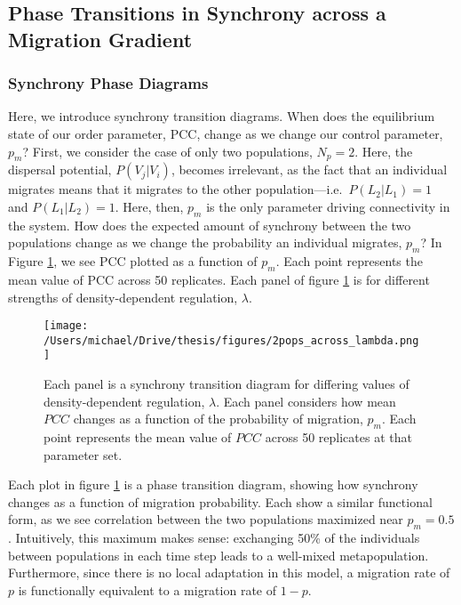 \pagebreak

\hypertarget{phase-transitions-in-synchrony-across-a-migration-gradient}{%
\subsection{Phase Transitions in Synchrony across a Migration
Gradient}\label{phase-transitions-in-synchrony-across-a-migration-gradient}}

\hypertarget{synchrony-phase-diagrams}{%
\subsubsection{Synchrony Phase
Diagrams}\label{synchrony-phase-diagrams}}

Here, we introduce synchrony transition diagrams. When does the
equilibrium state of our order parameter, \(\text{PCC}\), change as we
change our control parameter, \(p_m\)? First, we consider the case of
only two populations, \(N_p=2\). Here, the dispersal potential,
\(P(V_j|V_i)\), becomes irrelevant, as the fact that an individual
migrates means that it migrates to the other
population---i.e.~\(P(L_2|L_1)=1\) and \(P(L_1|L_2)=1\). Here, then,
\(p_m\) is the only parameter driving connectivity in the system. How
does the expected amount of synchrony between the two populations change
as we change the probability an individual migrates, \(p_m\)? In Figure
\ref{2pops_across_lambda}, we see \(\text{PCC}\) plotted as a function
of \(p_m\). Each point represents the mean value of \(\text{PCC}\)
across 50 replicates. Each panel of figure \ref{2pops_across_lambda} is
for different strengths of density-dependent regulation, \(\lambda\).

\begin{figure}[h]

\texttt{[image: /Users/michael/Drive/thesis/figures/2pops\_across\_lambda.png]}

\caption{Each panel is a synchrony transition diagram for differing values of density-dependent regulation, $\lambda$. Each panel considers how mean $PCC$ changes as a function of the probability of migration, $p_m$. Each point represents the mean value of $PCC$ across 50 replicates at that parameter set.}

\label{2pops_across_lambda}

\end{figure}

Each plot in figure \ref{2pops_across_lambda} is a phase transition
diagram, showing how synchrony changes as a function of migration
probability. Each show a similar functional form, as we see correlation
between the two populations maximized near \(p_m=0.5\). Intuitively,
this maximum makes sense: exchanging 50\% of the individuals between
populations in each time step leads to a well-mixed metapopulation.
Furthermore, since there is no local adaptation in this model, a
migration rate of \(p\) is functionally equivalent to a migration rate
of \(1 - p\).

